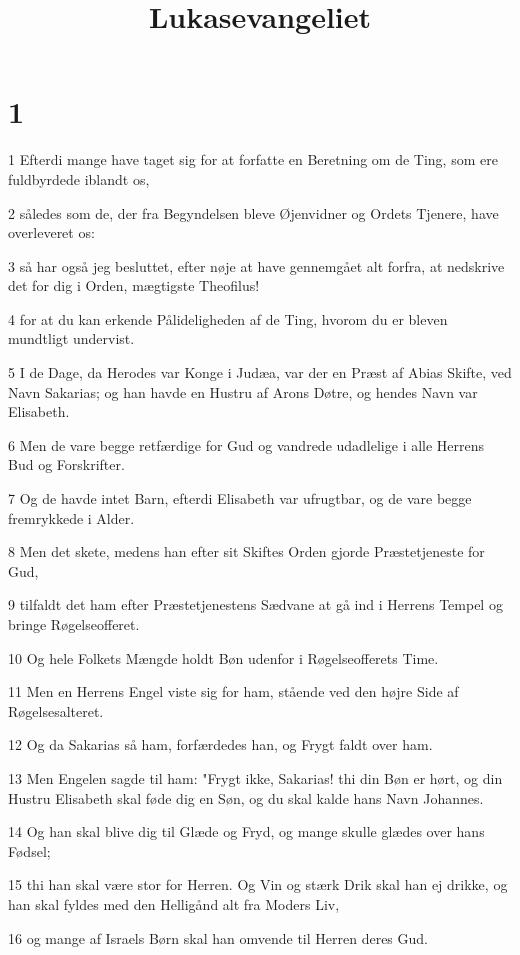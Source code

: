 

\title{Lukasevangeliet}


\chapter{1}

\par 1 Efterdi mange have taget sig for at forfatte en Beretning om de Ting, som ere fuldbyrdede iblandt os,
\par 2 således som de, der fra Begyndelsen bleve Øjenvidner og Ordets Tjenere, have overleveret os:
\par 3 så har også jeg besluttet, efter nøje at have gennemgået alt forfra, at nedskrive det for dig i Orden, mægtigste Theofilus!
\par 4 for at du kan erkende Pålideligheden af de Ting, hvorom du er bleven mundtligt undervist.
\par 5 I de Dage, da Herodes var Konge i Judæa, var der en Præst af Abias Skifte, ved Navn Sakarias; og han havde en Hustru af Arons Døtre, og hendes Navn var Elisabeth.
\par 6 Men de vare begge retfærdige for Gud og vandrede udadlelige i alle Herrens Bud og Forskrifter.
\par 7 Og de havde intet Barn, efterdi Elisabeth var ufrugtbar, og de vare begge fremrykkede i Alder.
\par 8 Men det skete, medens han efter sit Skiftes Orden gjorde Præstetjeneste for Gud,
\par 9 tilfaldt det ham efter Præstetjenestens Sædvane at gå ind i Herrens Tempel og bringe Røgelseofferet.
\par 10 Og hele Folkets Mængde holdt Bøn udenfor i Røgelseofferets Time.
\par 11 Men en Herrens Engel viste sig for ham, stående ved den højre Side af Røgelsesalteret.
\par 12 Og da Sakarias så ham, forfærdedes han, og Frygt faldt over ham.
\par 13 Men Engelen sagde til ham: "Frygt ikke, Sakarias! thi din Bøn er hørt, og din Hustru Elisabeth skal føde dig en Søn, og du skal kalde hans Navn Johannes.
\par 14 Og han skal blive dig til Glæde og Fryd, og mange skulle glædes over hans Fødsel;
\par 15 thi han skal være stor for Herren. Og Vin og stærk Drik skal han ej drikke, og han skal fyldes med den Helligånd alt fra Moders Liv,
\par 16 og mange af Israels Børn skal han omvende til Herren deres Gud.
